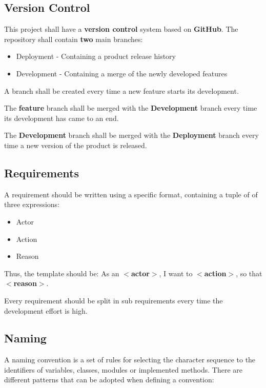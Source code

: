 \documentclass{scrreprt}
\begin{document}
\subsection{Version Control}

This project shall have a \textbf{version control} system based on \textbf{GitHub}. The repository shall contain \textbf{two} main branches:

\begin{itemize}
\item Deployment - Containing a product release history
\item Development - Containing a merge of the newly developed features
\end{itemize}

\par A branch shall be created every time a new feature starts its development.
\par The \textbf{feature} branch shall be merged with the \textbf{Development} branch every time its development has came to an end.
\par The \textbf{Development} branch shall be merged with the \textbf{Deployment} branch every time a new version of the product is released.

\subsection{Requirements}

A requirement should be written using a specific format, containing a tuple of of three expressions:

\begin{itemize}
\item Actor
\item Action
\item Reason
\end{itemize}

\par Thus, the template should be: As an \textbf{$<$actor$>$}, I want to \textbf{$<$action$>$}, so that \textbf{$<$reason$>$}.
\par Every requirement should be split in sub requirements every time the development effort is high.



\subsection{Naming}
A naming convention is a set of rules for selecting the character sequence to the identifiers of variables, classes, modules or implemented methods. There are different patterns that can be adopted when defining a convention:
\end{document}
